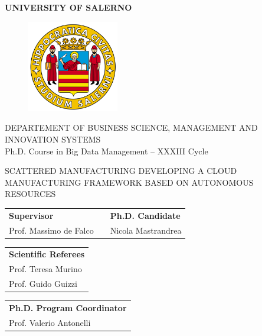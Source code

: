 \begin{center}
    \Large{\textbf{UNIVERSITY OF SALERNO}}
\end{center}

\begin{figure}[h]
    \centering
    \includegraphics[height=4cm,keepaspectratio]{images/logo_unisa.png}
\end{figure}

\vspace{5mm}

\begin{center}
    \large{DEPARTEMENT OF BUSINESS SCIENCE, MANAGEMENT AND INNOVATION SYSTEMS}
    \vspace{3mm}\\
    \large{Ph.D. Course in Big Data Management – XXXIII Cycle}
\end{center}

\vspace{5mm}

\begin{center}
    \large{SCATTERED MANUFACTURING DEVELOPING A CLOUD MANUFACTURING FRAMEWORK BASED ON AUTONOMOUS RESOURCES}
\end{center}

\vspace{15mm}

\begin{tabular}{lcl}
    \textbf{Supervisor} &  \hspace{30mm}  & \textbf{Ph.D. Candidate}\\
    Prof. Massimo de Falco &  \hspace{30mm}  & Nicola Mastrandrea\\
\end{tabular}

\vspace{15mm}

\begin{tabular}{l}
    \textbf{Scientific Referees}\\
    Prof. Teresa Murino\\
    Prof. Guido Guizzi\\
\end{tabular}

\vspace{15mm}

\begin{tabular}{l}
    \textbf{Ph.D. Program Coordinator}\\
    Prof. Valerio Antonelli
\end{tabular}
